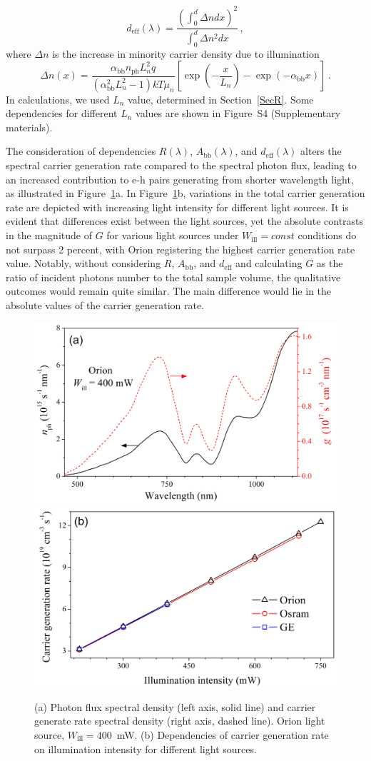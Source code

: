 \documentclass{WileyMSP-template}
\begin{document}
\begin{equation}
\label{eqdeff}
d_\mathrm{eff}(\lambda)=\frac{\left(\int_0^d \Delta n dx\right)^2}{\int_0^d \Delta n^2 dx}\,,
\end{equation}
where
$\Delta n$ is the increase in minority carrier density due to illumination
\begin{equation}
\label{eqdeln}
\Delta n (x)=\frac{\alpha_\mathrm{bb} n_\mathrm{ph} L_n^2 q}{(\alpha_\mathrm{bb}^2 L_n^2-1)kT\mu_n}
\left[\exp\left(-\frac{x}{L_n}\right)-\exp\left(-\alpha_\mathrm{bb} x\right)\right]\,.
\end{equation}
In calculations, we used $L_n$ value, determined in Section~\ref{SecR}.
Some dependencies for different $L_n$ values are shown in Figure~S4 (Supplementary materials).

The consideration of dependencies $R(\lambda)$, $A_\mathrm{bb}(\lambda)$, and $d_\mathrm{eff}(\lambda)$ alters
the spectral carrier generation rate compared to the spectral photon flux,
leading to an increased contribution to e-h pairs generating from shorter wavelength light,
as illustrated in Figure~\ref{fig5}a.
In Figure~\ref{fig5}b, variations in the total carrier generation rate are depicted with increasing light intensity for different light sources.
It is evident that differences exist between the light sources,
yet the absolute contrasts in the magnitude of $G$ for various light sources under $W_\mathrm{ill}=const$ conditions do not surpass 2 percent,
with Orion registering the highest carrier generation rate value.
Notably, without considering $R$, $A_\mathrm{bb}$, and $d_\mathrm{eff}$ and calculating $G$  as the ratio of incident photons number
to the total sample volume, the qualitative outcomes would remain quite similar. The main difference would lie in the absolute values of the carrier generation rate.

\begin{figure}
\centering
  \includegraphics[width=0.4\linewidth]{Fig5a.png}
  \includegraphics[width=0.4\linewidth]{Fig5b.png}
  \caption{
  (a) Photon flux spectral density (left axis, solid line) and carrier generate rate spectral density (right axis, dashed line).
  Orion light source, $W_\mathrm{ill}=400$~mW.
  (b) Dependencies of carrier generation rate on illumination intensity for different light sources.
  }
  \label{fig5}
\end{figure}
\end{document}
